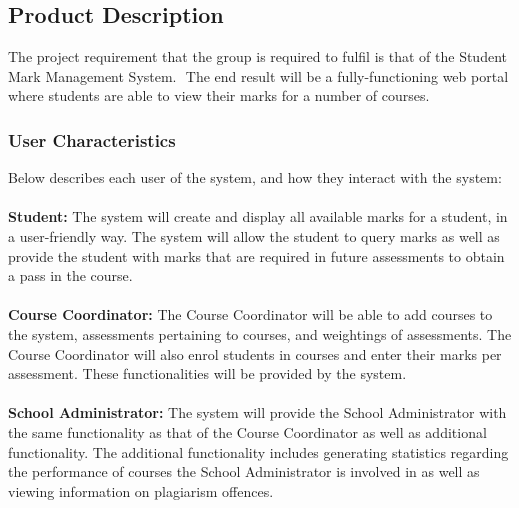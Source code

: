 \documentclass[paper=a4, fontsize=11pt]{scrartcl}
\numberwithin{equation}{section}		%
\numberwithin{figure}{section}			%
\numberwithin{table}{section}				%
\begin{document}
\subsection{Product Description}
The project requirement that the group is required to fulfil is that of the  Student Mark
Management System. ​ The end result will be a fully-functioning web portal where students
are able to view their marks for a number of courses.





\subsubsection{User Characteristics}
Below describes each user of the system, and how they interact with the system:\\\\\textbf{Student:}
The system will create and display all available marks for a student, in a user-friendly way. The system will allow the student to query marks as well as provide the student with marks that are required in future assessments to obtain a pass in the course.\\\\\textbf{Course Coordinator:}
The Course Coordinator will be able to add courses to the system, assessments pertaining to courses, and weightings of assessments. The Course Coordinator will also enrol students in courses and enter their marks per assessment. These functionalities will be provided by the system.\\\\\textbf{School Administrator:}
The system will provide the School Administrator with the same functionality as that of the Course Coordinator as well as additional functionality. The additional functionality includes generating statistics regarding the performance of courses the School Administrator is involved in as well as viewing information on plagiarism offences.



\end{document}
